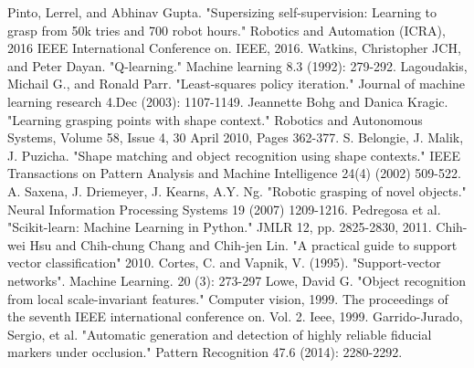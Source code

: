 \documentclass[a4paper, 10pt, conference]{ieeeconf}      %
\begin{document}
\begin{thebibliography}{99}

Pinto, Lerrel, and Abhinav Gupta. "Supersizing self-supervision: Learning to grasp from 50k tries and 700 robot hours." Robotics and Automation (ICRA), 2016 IEEE International Conference on. IEEE, 2016.
Watkins, Christopher JCH, and Peter Dayan. "Q-learning." Machine learning 8.3 (1992): 279-292.
Lagoudakis, Michail G., and Ronald Parr. "Least-squares policy iteration." Journal of machine learning research 4.Dec (2003): 1107-1149.
Jeannette Bohg and Danica Kragic. "Learning grasping points with shape context." Robotics and Autonomous Systems, Volume 58, Issue 4, 30 April 2010, Pages 362-377.
S. Belongie, J. Malik, J. Puzicha. "Shape matching and object recognition using shape contexts." IEEE Transactions on Pattern Analysis and Machine Intelligence 24(4) (2002) 509-522.
A. Saxena, J. Driemeyer, J. Kearns, A.Y. Ng. "Robotic grasping of novel objects." Neural Information Processing Systems 19 (2007) 1209-1216.
Pedregosa et al. "Scikit-learn: Machine Learning in Python." JMLR 12, pp. 2825-2830, 2011.
Chih-wei Hsu and Chih-chung Chang and Chih-jen Lin. "A practical guide to support vector classification" 2010.
Cortes, C. and Vapnik, V. (1995). "Support-vector networks". Machine Learning. 20 (3): 273-297
Lowe, David G. "Object recognition from local scale-invariant features." Computer vision, 1999. The proceedings of the seventh IEEE international conference on. Vol. 2. Ieee, 1999.
Garrido-Jurado, Sergio, et al. "Automatic generation and detection of highly reliable fiducial markers under occlusion." Pattern Recognition 47.6 (2014): 2280-2292.





\end{thebibliography}
\end{document}

